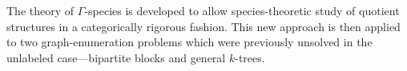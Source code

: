 \documentclass[sectionflow,singlespace,twoside,boldmathhdr,draft]{brandiss} %
\numberwithin{section}{chapter}
\numberwithin{figure}{chapter}
\begin{document}

\frontmatter

\makedisstitle

\begin{comment}
  \begin{disssignatures}
    \committeemember Second Member, Dept.~of Mathematics
    \committeemember Third Member, Dept.~of Mathematics, Outside University
  \end{disssignatures}

  \disscopyright %

  \begin{dissdedication}
    A dedication is optional.
  \end{dissdedication}

  \begin{dissacknowledgments} %
    I wish to thank my advisor for her help and support.

    I am grateful to the members of my dissertation defense committee.
    
    I owe thanks to the faculty, to my fellow students, and to the kind
    and supportive staff of the Brandeis Mathematics Department.
  \end{dissacknowledgments}
\end{comment}

\begin{dissabstract}
  The theory of $\Gamma$-species is developed to allow species-theoretic study of quotient structures in a categorically rigorous fashion.
  This new approach is then applied to two graph-enumeration problems which were previously unsolved in the unlabeled case---bipartite blocks and general $k$-trees.
\end{dissabstract}
\end{document}
